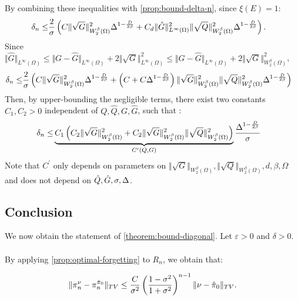 By combining these inequalities with \cref{prop:bound-delta-n}, since $\xi(E) = 1$:
\begin{align}
    \delta_n \leq & \frac{2}{\sigma}\left(C\Vert \sqrt{G}\Vert^2_{W^\beta_2(\Omega)}\Delta^{1- \frac{D}{2\beta}} + C_d \Vert\hat G\Vert_{L^\infty(\Omega)}^2\Vert \sqrt{Q}\Vert^2_{W^\beta_2(\Omega)}\Delta^{1 - \frac{D}{2\beta}}\right).
\end{align}
Since $\Vert \hat G\Vert_{L^\infty(\Omega)} \leq \Vert G - \hat G \Vert_{L^\infty(\Omega)} + 2 \Vert \sqrt{G}\Vert_{L^\infty(\Omega)}^2 \leq \Vert G - \hat G \Vert_{L^\infty(\Omega)} + 2 \Vert \sqrt{G}\Vert^2_{W^\beta_2(\Omega)}$,
\begin{align*}
    \delta_n \leq & \frac{2}{\sigma}\left(C\Vert \sqrt{G}\Vert^2_{W^\beta_2(\Omega)}\Delta^{1- \frac{D}{2\beta}} + \left(C + C\Delta^{1- \frac{D}{2\beta}}\right)\Vert\sqrt{G}\Vert^2_{W^\beta_2(\Omega)}\Vert\sqrt{Q}\Vert^2_{W^\beta_2(\Omega)}\Delta^{1 - \frac{D}{2\beta}}\right)
\end{align*}
Then, by upper-bounding the negligible terms, there exist two constants $C_1, C_2>0$ independent of $Q, \hat Q, G, \hat G$, such that :
\begin{align}
    \delta_n \leq & \underbrace{C_1\left(C_2 \Vert\sqrt{G}\Vert^2_{W^\beta_2(\Omega)} + C_2\Vert \sqrt{G}\Vert^2_{W^\beta_2(\Omega)}\Vert \sqrt{Q}\Vert^2_{W^\beta_2(\Omega)} \right)}_{C^\prime(Q, G)} \frac{\Delta^{1-\frac{D}{2\beta}}}{\sigma}
\end{align}
Note that $C^\prime$ only depends on parameters on $\Vert \sqrt{G}\Vert_{W^\beta_2(\Omega)}, \Vert \sqrt{Q}\Vert_{W^\beta_2(\Omega)}, d, \beta, \Omega$ and does not depend on $\hat{Q}, \hat{G}, \sigma, \Delta$.

\subsection{Conclusion}\label{sec:bound-proof-conclusion}
We now obtain the statement of \cref{theorem:bound-diagonal}. Let $\varepsilon > 0$ and $\delta>0$.

\paragraph{}
By applying \cref{prop:optimal-forgetting} to $R_n$, we obtain that:

\begin{equation}\label{eq:forgetting}
\Vert \pi_n^\nu - \pi^{\hat\pi_0}_n \Vert_{TV} \leq \frac{C}{\sigma^2}\left(\frac{1 - \sigma^2}{1 + \sigma^2}\right)^{n-1}\Vert \nu - \hat \pi_0\Vert_{TV}.
\end{equation}

